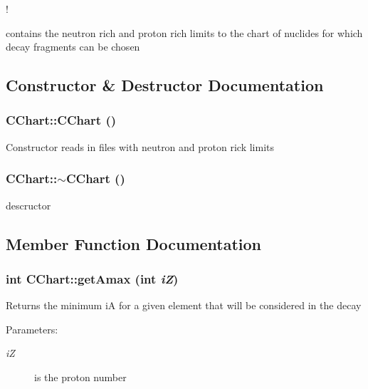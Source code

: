 !

contains the neutron rich and proton rich limits to the chart of nuclides for which decay fragments can be chosen 



\subsection{Constructor \& Destructor Documentation}
\subsubsection{\setlength{\rightskip}{0pt plus 5cm}CChart::CChart ()\hspace{0.3cm}{\tt  [private]}}\label{classCChart_5487e6755d174a556cf9705ea69ceb1d}


Constructor reads in files with neutron and proton rick limits 
\subsubsection{\setlength{\rightskip}{0pt plus 5cm}CChart::$\sim$CChart ()}\label{classCChart_66890c06bca14a03b2e44d312a77d86a}


descructor 

\subsection{Member Function Documentation}
\subsubsection{\setlength{\rightskip}{0pt plus 5cm}int CChart::get\-Amax (int {\em i\-Z})}\label{classCChart_e8dc2778d3aa4aced64e4f9770ecce0f}


Returns the minimum i\-A for a given element that will be considered in the decay \begin{Desc}
\item[Parameters:]
\begin{description}
\item[{\em i\-Z}]is the proton number \end{description}
\end{Desc}
